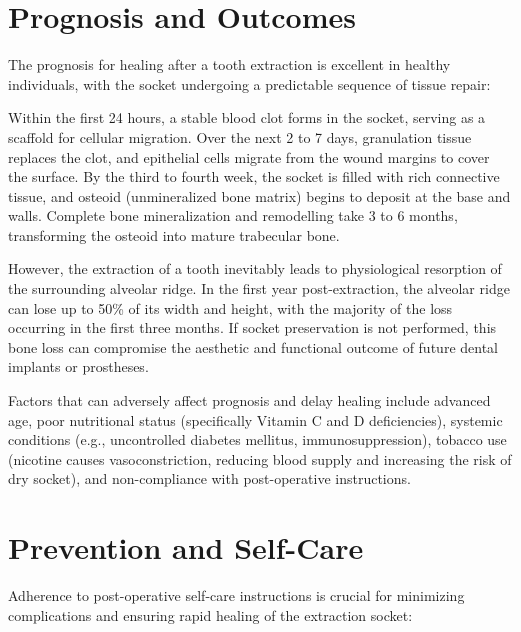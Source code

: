 \section*{Prognosis and Outcomes}
The prognosis for healing after a tooth extraction is excellent in healthy individuals, with the socket undergoing a predictable sequence of tissue repair:

Within the first 24 hours, a stable blood clot forms in the socket, serving as a scaffold for cellular migration. Over the next 2 to 7 days, granulation tissue replaces the clot, and epithelial cells migrate from the wound margins to cover the surface. By the third to fourth week, the socket is filled with rich connective tissue, and osteoid (unmineralized bone matrix) begins to deposit at the base and walls. Complete bone mineralization and remodelling take 3 to 6 months, transforming the osteoid into mature trabecular bone.

However, the extraction of a tooth inevitably leads to physiological resorption of the surrounding alveolar ridge. In the first year post-extraction, the alveolar ridge can lose up to 50\% of its width and height, with the majority of the loss occurring in the first three months. If socket preservation is not performed, this bone loss can compromise the aesthetic and functional outcome of future dental implants or prostheses.

Factors that can adversely affect prognosis and delay healing include advanced age, poor nutritional status (specifically Vitamin C and D deficiencies), systemic conditions (e.g., uncontrolled diabetes mellitus, immunosuppression), tobacco use (nicotine causes vasoconstriction, reducing blood supply and increasing the risk of dry socket), and non-compliance with post-operative instructions.

\section*{Prevention and Self-Care}
Adherence to post-operative self-care instructions is crucial for minimizing complications and ensuring rapid healing of the extraction socket:

